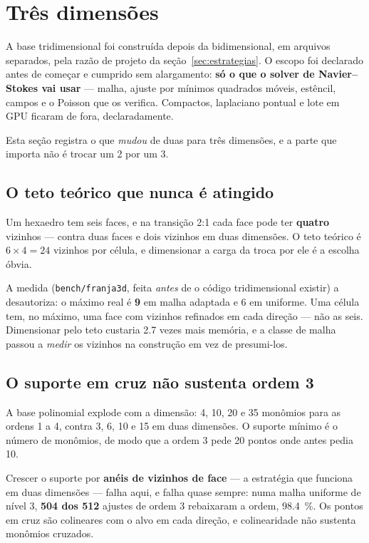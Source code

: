 \section{Três dimensões}
\label{sec:tres-dimensoes}

A base tridimensional foi construída depois da bidimensional, em arquivos
separados, pela razão de projeto da seção~\ref{sec:estrategias}. O escopo foi
declarado antes de começar e cumprido sem alargamento: \textbf{só o que o solver
de Navier--Stokes vai usar} --- malha, ajuste por mínimos quadrados móveis,
estêncil, campos e o Poisson que os verifica. Compactos, laplaciano pontual e
lote em GPU ficaram de fora, declaradamente.

Esta seção registra o que \emph{mudou} de duas para três dimensões, e a parte
que importa não é trocar um 2 por um 3.

\subsection{O teto teórico que nunca é atingido}

Um hexaedro tem seis faces, e na transição 2:1 cada face pode ter
\textbf{quatro} vizinhos --- contra duas faces e dois vizinhos em duas dimensões.
O teto teórico é $6\times 4 = 24$ vizinhos por célula, e dimensionar a carga da
troca por ele é a escolha óbvia.

A medida (\texttt{bench/franja3d}, feita \emph{antes} de o código tridimensional
existir) a desautoriza: o máximo real é \textbf{9} em malha adaptada e 6 em
uniforme. Uma célula tem, no máximo, uma face com vizinhos refinados em cada
direção --- não as seis. Dimensionar pelo teto custaria \num{2.7} vezes mais
memória, e a classe de malha passou a \emph{medir} os vizinhos na construção em
vez de presumi-los.

\subsection{O suporte em cruz não sustenta ordem 3}

A base polinomial explode com a dimensão: 4, 10, 20 e 35 monômios para as ordens
1 a 4, contra 3, 6, 10 e 15 em duas dimensões. O suporte mínimo é o número de
monômios, de modo que a ordem 3 pede 20 pontos onde antes pedia 10.

Crescer o suporte por \textbf{anéis de vizinhos de face} --- a estratégia que
funciona em duas dimensões --- falha aqui, e falha quase sempre: numa malha
uniforme de nível 3, \textbf{504 dos 512} ajustes de ordem 3 rebaixaram a ordem,
\SI{98.4}{\percent}. Os pontos em cruz são colineares com o alvo em cada direção,
e colinearidade não sustenta monômios cruzados.

